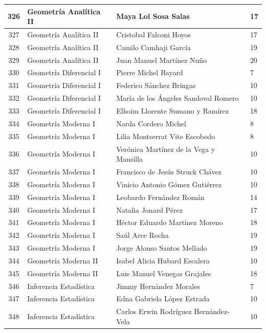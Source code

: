 {\begin{longtable}{|c|p{6.5cm}|p{5cm}|p{1.5cm}|}
  326 & Geometría Analítica II & Maya Lol Sosa Salas & 17 \\ \hline
  327 & Geometría Analítica II & Cristobal Falconi Hoyos & 17 \\ \hline
  328 & Geometría Analítica II & Camilo Camhaji García & 19 \\ \hline
  329 & Geometría Analítica II & Juan Manuel Martínez Nuño & 20 \\ \hline
  330 & Geometría Diferencial I & Pierre Michel Bayard & 7 \\ \hline
  331 & Geometría Diferencial I & Federico Sánchez Bringas & 10 \\ \hline
  332 & Geometría Diferencial I & María de los Ángeles Sandoval Romero & 10 \\ \hline
  333 & Geometría Diferencial I & Elhoim Llorente Sumano y Ramírez & 18 \\ \hline
  334 & Geometría Moderna I & Narda Cordero Michel & 8 \\ \hline
  335 & Geometría Moderna I & Lilia Montserrat Vite Escobedo & 8 \\ \hline
  336 & Geometría Moderna I & Verónica Martínez de la Vega y Mansilla & 10 \\ \hline
  337 & Geometría Moderna I & Francisco de Jesús Struck Chávez & 10 \\ \hline
  338 & Geometría Moderna I & Vinicio Antonio Gómez Gutiérrez & 10 \\ \hline
  339 & Geometría Moderna I & Leobardo Fernández Román & 14 \\ \hline
  340 & Geometría Moderna I & Natalia Jonard Pérez & 17 \\ \hline
  341 & Geometría Moderna I & Héctor Eduardo Martínez Moreno & 18 \\ \hline
  342 & Geometría Moderna I & Saúl Arce Rocha & 19 \\ \hline
  343 & Geometría Moderna I & Jorge Alonso Santos Mellado & 19 \\ \hline
  344 & Geometría Moderna II & Isabel Alicia Hubard Escalera & 10 \\ \hline
  345 & Geometría Moderna II & Luis Manuel Venegas Grajales & 18 \\ \hline
  346 & Inferencia Estadística & Jimmy Hernández Morales & 7 \\ \hline
  347 & Inferencia Estadística & Edna Gabriela López Estrada & 10 \\ \hline
  348 & Inferencia Estadística & Carlos Erwin Rodríguez Hernández-Vela & 10 \\ \hline

\end{longtable}}
